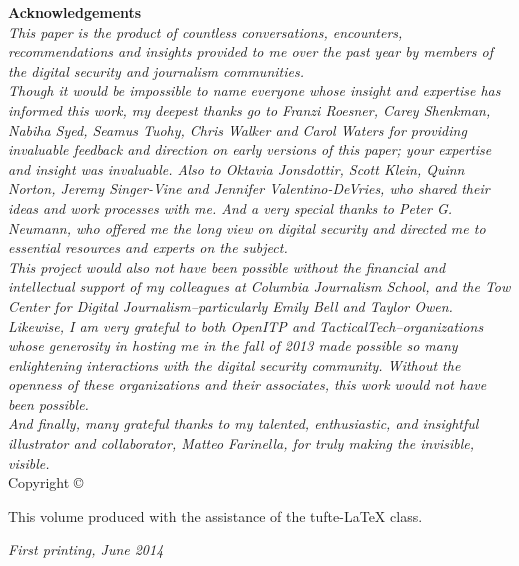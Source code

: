 \documentclass{tufte-book}
\newcommand{\monthyear}{%
  \ifcase\month\or January\or February\or March\or April\or May\or June\or
  July\or August\or September\or October\or November\or
  December\fi\space\number\year
}
\begin{document}
\newpage
\null
\vfill
\begin{fullwidth}
\textsf{\textbf{Acknowledgements}} 
\\[1.0cm]
\noindent\textit{This paper is the product of countless conversations, encounters, recommendations and insights provided to me over the past year by members of the digital security and journalism communities.}\\[0.5cm]

\noindent\textit{Though it would be impossible to name everyone whose insight and expertise has informed this work, my deepest thanks go to Franzi Roesner, Carey Shenkman, Nabiha Syed, Seamus Tuohy, Chris Walker and Carol Waters for providing invaluable feedback and direction on early versions of this paper; your expertise and insight was invaluable. Also to Oktavia Jonsdottir, Scott Klein, Quinn Norton, Jeremy Singer-Vine and Jennifer Valentino-DeVries, who shared their ideas and work processes with me. And a very special thanks to Peter G. Neumann, who offered me the long view on digital security and directed me to essential resources and experts on the subject.} \\[0.5cm]

\noindent\textit{This project would also not have been possible without the financial and intellectual support of my colleagues at Columbia Journalism School, and the Tow Center for Digital Journalism--particularly Emily Bell and Taylor Owen. Likewise, I am very grateful to both OpenITP and TacticalTech--organizations whose generosity in hosting me in the fall of 2013 made possible so many enlightening interactions with the digital security community. Without the openness of these organizations and their associates, this work would not have been possible.} \\[0.5cm]

\noindent\textit{And finally, many grateful thanks to my talented, enthusiastic, and insightful illustrator and collaborator, Matteo Farinella, for truly making the invisible, visible.} \\[1.0cm]

\noindent \small{Copyright \copyright\ \the\year\ \thanklessauthor}

\noindent \small{This volume produced with the assistance of the \textsf{tufte-\LaTeX{}} class.}

\noindent\textit{First printing, June 2014}
\end{fullwidth}

\tableofcontents
\end{document}
